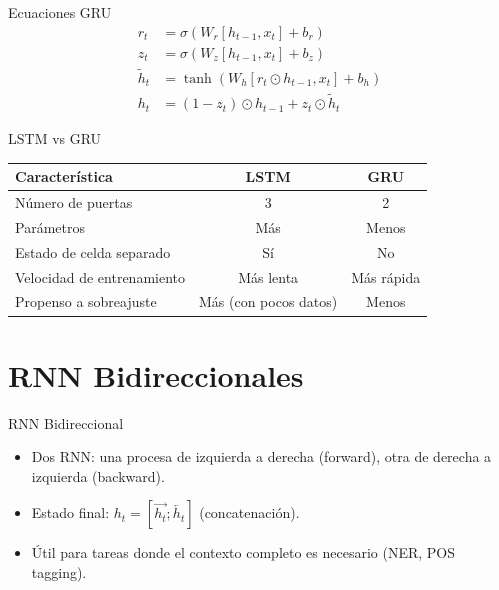\documentclass[aspectratio=169, 10pt, xcolor=table]{beamer}
\begin{document}
\begin{frame}{Ecuaciones GRU}
    \begin{align*}
        r_t &= \sigma(W_r [h_{t-1}, x_t] + b_r) \\
        z_t &= \sigma(W_z [h_{t-1}, x_t] + b_z) \\
        \tilde{h}_t &= \tanh(W_h [r_t \odot h_{t-1}, x_t] + b_h) \\
        h_t &= (1 - z_t) \odot h_{t-1} + z_t \odot \tilde{h}_t
    \end{align*}
\end{frame}

\begin{frame}{LSTM vs GRU}
    \begin{table}
        \centering
        \begin{tabular}{l|c|c}
            \toprule
            \textbf{Característica} & \textbf{LSTM} & \textbf{GRU} \\
            \midrule
            Número de puertas & 3 & 2 \\
            Parámetros & Más & Menos \\
            Estado de celda separado & Sí & No \\
            Velocidad de entrenamiento & Más lenta & Más rápida \\
            Propenso a sobreajuste & Más (con pocos datos) & Menos \\
            \bottomrule
        \end{tabular}
    \end{table}
\end{frame}

\section{RNN Bidireccionales}

\begin{frame}{RNN Bidireccional}
    \begin{itemize}
        \item Dos RNN: una procesa de izquierda a derecha (forward), otra de derecha a izquierda (backward).
        \item Estado final: $h_t = [\overrightarrow{h_t}; \overleftarrow{h_t}]$ (concatenación).
        \item Útil para tareas donde el contexto completo es necesario (NER, POS tagging).
    \end{itemize}
\end{frame}
\end{document}
